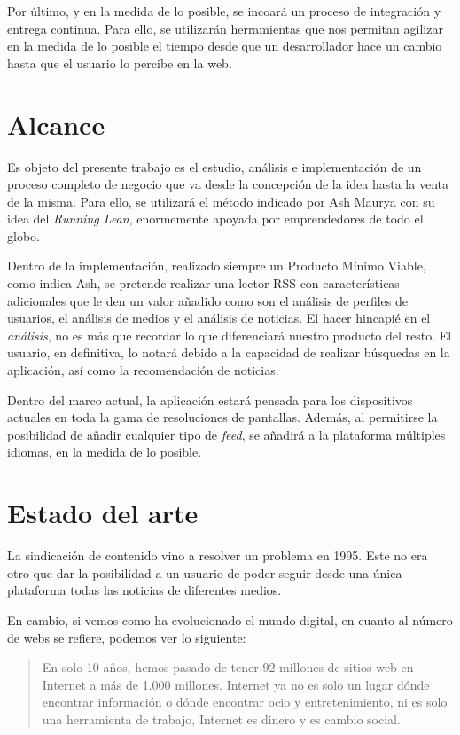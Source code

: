 Por último, y en la medida de lo posible, se incoará un proceso de integración y entrega continua. Para ello, se utilizarán herramientas que nos permitan agilizar en la medida de lo posible el tiempo desde que un desarrollador hace un cambio hasta que el usuario lo percibe en la web.


\section{Alcance}\label{sec:alcance}

Es objeto del presente trabajo es el estudio, análisis e implementación de un proceso completo de negocio que va desde la concepción de la idea hasta la venta de la misma. Para ello, se utilizará el método indicado por Ash Maurya con su idea del \textit{Running Lean}, enormemente apoyada por emprendedores de todo el globo.

Dentro de la implementación, realizado siempre un Producto Mínimo Viable, como indica Ash, se pretende realizar una lector RSS con características adicionales que le den un valor añadido como son el análisis de perfiles de usuarios, el análisis de medios y el análisis de noticias. El hacer hincapié en el \textit{análisis}, no es más que recordar lo que diferenciará nuestro producto del resto. El usuario, en definitiva, lo notará debido a la capacidad de realizar búsquedas en la aplicación, así como la recomendación de noticias.

Dentro del marco actual, la aplicación estará pensada para los dispositivos actuales en toda la gama de resoluciones de pantallas. Además, al permitirse la posibilidad de añadir cualquier tipo de \textit{feed}, se añadirá a la plataforma múltiples idiomas, en la medida de lo posible.


\section{Estado del arte}\label{sec:arte}

La sindicación de contenido vino a resolver un problema en 1995. Este no era otro que dar la posibilidad a un usuario de poder seguir desde una única plataforma todas las noticias de diferentes medios.

En cambio, si vemos como ha evolucionado el mundo digital, en cuanto al número de webs se refiere, podemos ver lo siguiente:

\begin{quote}
	\small En solo 10 años, hemos pasado de tener 92 millones de sitios web en Internet a más de 1.000 millones. Internet ya no es solo un lugar dónde encontrar información o dónde encontrar ocio y entretenimiento, ni es solo una herramienta de trabajo, Internet es dinero y es cambio social.
	\begin{flushright}
	\end{flushright}
\end{quote}

